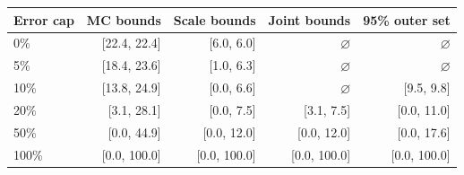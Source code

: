 \begin{tabular}{lrrrr}
\toprule
Error cap & MC bounds & Scale bounds & Joint bounds & 95\% outer set \\
\midrule
0\% & [22.4, 22.4] & [6.0, 6.0] & $\varnothing$ & $\varnothing$ \\
5\% & [18.4, 23.6] & [1.0, 6.3] & $\varnothing$ & $\varnothing$ \\
10\% & [13.8, 24.9] & [0.0, 6.6] & $\varnothing$ & [9.5, 9.8] \\
20\% & [3.1, 28.1] & [0.0, 7.5] & [3.1, 7.5] & [0.0, 11.0] \\
50\% & [0.0, 44.9] & [0.0, 12.0] & [0.0, 12.0] & [0.0, 17.6] \\
100\% & [0.0, 100.0] & [0.0, 100.0] & [0.0, 100.0] & [0.0, 100.0] \\
\bottomrule
\end{tabular}
